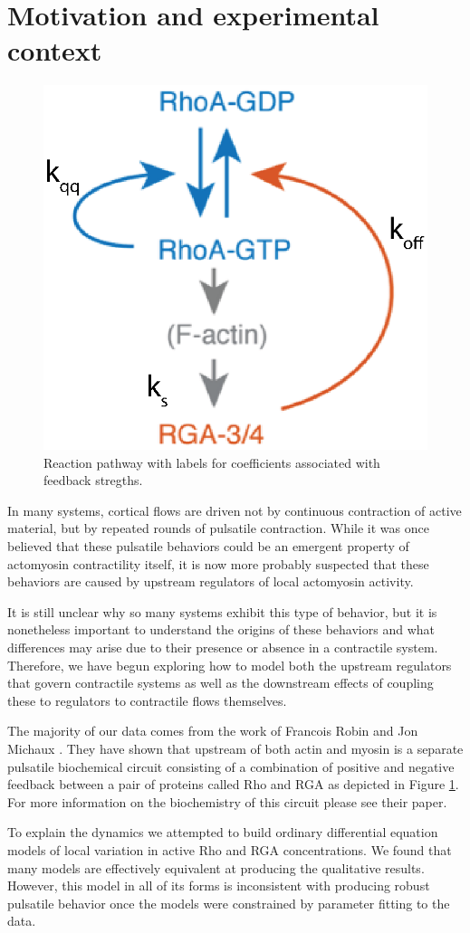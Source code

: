 \section{Motivation and experimental context}
\begin{figure}[h!]
	\centering
	\includegraphics[width=0.5\hsize]{pulse/diagram_eq.eps}
	\caption{\label{fig:pulse_diag}  Reaction pathway with labels for coefficients associated with feedback stregths.}
\end{figure}

In many systems, cortical flows are driven not by continuous contraction of active material, but by repeated rounds of pulsatile contraction.  While it was once believed that these pulsatile behaviors could be an emergent property of actomyosin contractility itself, it is now more probably suspected that these behaviors are caused by upstream regulators of local actomyosin activity.

It is still unclear why so many systems exhibit this type of behavior, but it is nonetheless important to understand the origins of these behaviors and what differences may arise due to their presence or absence in a contractile system.  Therefore, we have begun exploring how to model both the upstream regulators that govern contractile systems as well as the downstream effects of coupling these to regulators to contractile flows themselves.

The majority of our data comes from the work of Francois Robin and Jon Michaux \cite{Robin076356}.  They have shown that upstream of both actin and myosin is a separate pulsatile biochemical circuit consisting of a combination of positive and negative feedback between a pair of proteins called Rho and RGA as depicted in Figure \ref{fig:pulse_diag}.  For more information on the biochemistry of this circuit please see their paper.  

To explain the dynamics we attempted to build ordinary differential equation models of local variation in active Rho and RGA concentrations.  We found that many models are effectively equivalent at producing the qualitative results.  However, this model in all of its forms is inconsistent with producing robust pulsatile behavior once the models were constrained by parameter fitting to the data. 


